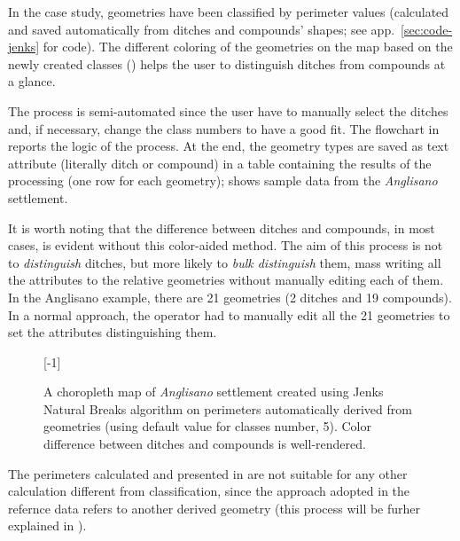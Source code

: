             In the case study, geometries have been classified by perimeter values (calculated and saved automatically from ditches and compounds' shapes; see app.~\ref{sec:code-jenks} for code). The different coloring of the geometries on the map based on the newly created classes () helps the user to distinguish ditches from compounds at a glance.

            The process is semi-automated since the user have to manually select the ditches and, if necessary, change the class numbers to have a good fit. The flowchart in  reports the logic of the process. At the end, the geometry types are saved as text attribute (literally \textsf{ditch} or \textsf{compound}) in a table containing the results of the processing (one row for each geometry);  shows sample data from the \emph{Anglisano} settlement.

            It is worth noting that the difference between ditches and compounds, in most cases, is evident without this color-aided method. The aim of this process is not to \emph{distinguish} ditches, but more likely to \emph{bulk distinguish} them, mass writing all the attributes to the relative geometries without manually editing each of them. In the Anglisano example, there are 21 geometries (2 ditches and 19 compounds). In a normal approach, the operator had to manually edit all the 21 geometries to set the attributes distinguishing them.

            \begin{figure}[H]
                \centering
                \scalebox{1}[-1]{ %
                    \begin{tikzpicture}[x=1mm,y=1mm,scale=0.22]
                        
                    \end{tikzpicture}
                }
                \caption[A choropleth map of \emph{Anglisano} settlement using Jenks Natural Breaks]{A choropleth map of \emph{Anglisano} settlement created using Jenks Natural Breaks algorithm on perimeters automatically derived from geometries (using default value for classes number, 5). Color difference between ditches and compounds is well-rendered.}
                \label{fig:jenks-color}
            \end{figure}

            The perimeters calculated and presented in  are not suitable for any other calculation different from classification, since the approach adopted in the refernce data \cite{laterza} refers to another derived geometry (this process will be furher explained in ).

